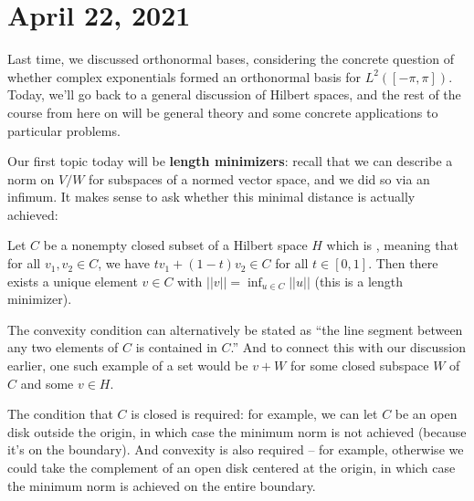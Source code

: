 \pagebreak\section{April 22, 2021}

Last time, we discussed orthonormal bases, considering the concrete question of whether complex exponentials formed an orthonormal basis for $L^2([-\pi, \pi])$. Today, we'll go back to a general discussion of Hilbert spaces, and the rest of the course from here on will be general theory and some concrete applications to particular problems. 

Our first topic today will be \textbf{length minimizers}: recall that we can describe a norm on $V/W$ for subspaces of a normed vector space, and we did so via an infimum. It makes sense to ask whether this minimal distance is actually achieved:

\begin{theorem}\label{lengthminimizer}
Let $C$ be a nonempty closed subset of a Hilbert space $H$ which is , meaning that for all $v_1, v_2 \in C$, we have $tv_1 + (1-t)v_2 \in C$ for all $t \in [0, 1]$. Then there exists a unique element $v \in C$ with $||v|| = \inf_{u \in C} ||u||$ (this is a length minimizer).
\end{theorem}

The convexity condition can alternatively be stated as ``the line segment between any two elements of $C$ is contained in $C$.'' And to connect this with our discussion earlier, one such example of a set would be $v + W$ for some closed subspace $W$ of $C$ and some $v \in H$. 

\begin{remark}
The condition that $C$ is closed is required: for example, we can let $C$ be an open disk outside the origin, in which case the minimum norm is not achieved (because it's on the boundary). And convexity is also required -- for example, otherwise we could take the complement of an open disk centered at the origin, in which case the minimum norm is achieved on the entire boundary. 
\end{remark} 

